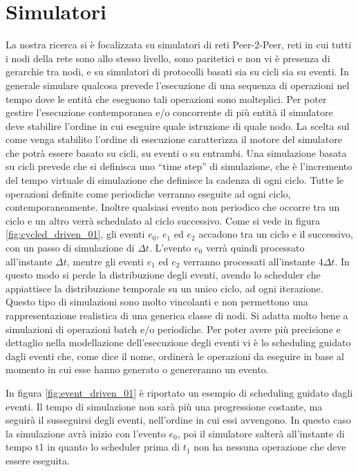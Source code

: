 \section{Simulatori}
\label{sec:simulatori}
La nostra ricerca si è focalizzata su simulatori di reti Peer-2-Peer, reti in cui tutti i nodi della rete sono allo stesso livello, sono paritetici e non vi è presenza di gerarchie tra nodi, e su simulatori di protocolli basati sia su cicli sia su eventi. In generale simulare qualcosa prevede l'esecuzione di una sequenza di operazioni nel tempo dove le entità che eseguono tali operazioni sono molteplici. Per poter gestire l'esecuzione contemporanea e/o concorrente di più entità il simulatore deve stabilire l'ordine in cui eseguire quale istruzione di quale nodo. La scelta sul come venga stabilito l'ordine di esecuzione caratterizza il motore del simulatore che potrà essere basato su cicli, su eventi o su entrambi. Una simulazione basata su cicli prevede che si definisca uno “time step” di simulazione, che è l'incremento del tempo virtuale di simulazione che definisce la cadenza di ogni ciclo. Tutte le operazioni definite come periodiche verranno eseguite ad ogni ciclo, contemporaneamente. Inoltre qualsiasi evento non periodico che occorre tra un ciclo e un altro verrà schedulato al ciclo successivo. Come si vede in figura \ref{fig:cycled_driven_01}, gli eventi $e_0$, $e_1$ ed $e_2$ accadono tra un ciclo e il successivo, con un passo di simulazione di $\Delta t$. L'evento $e_0$ verrà quindi processato all'instante $\Delta t$, mentre gli eventi $e_1$ ed $e_2$ verranno processati all'instante $4\Delta t$. In questo modo si perde la distribuzione degli eventi, avendo lo scheduler che appiattisce la distribuzione temporale su un unico ciclo, ad ogni iterazione. Questo tipo di simulazioni sono molto vincolanti e non permettono una rappresentazione realistica di una generica classe di nodi. Si adatta molto bene a simulazioni di operazioni batch e/o periodiche. Per poter avere più precisione e dettaglio nella modellazione dell'esecuzione degli eventi vi è lo scheduling guidato dagli eventi che, come dice il nome, ordinerà le operazioni da eseguire in base al momento in cui esse hanno generato o genereranno un evento.

In figura \ref{fig:event_driven_01} è riportato un esempio di scheduling guidato dagli eventi. Il tempo di simulazione non sarà più una progressione costante, ma seguirà il susseguirsi degli eventi, nell'ordine in cui essi avvengono. In questo caso la simulazione avrà inizio con l'evento $e_0$, poi il simulatore salterà all'instante di tempo t1 in quanto lo scheduler prima di $t_1$ non ha nessuna operazione che deve essere eseguita.


